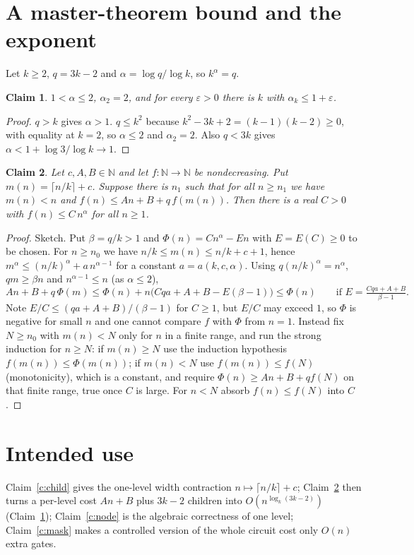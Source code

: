 \documentclass{article}
\newtheorem{claim}{Claim}
\begin{document}
\section{A master-theorem bound and the exponent}
Let $k\ge2$, $q=3k-2$ and $\alpha=\log q/\log k$, so $k^\alpha=q$.

\begin{claim}\label{c:alpha}
$1<\alpha\le2$, $\alpha_2=2$, and for every $\varepsilon>0$ there is $k$ with $\alpha_k\le 1+\varepsilon$.
\end{claim}
\begin{proof} $q>k$ gives $\alpha>1$. $q\le k^2$ because $k^2-3k+2=(k-1)(k-2)\ge0$, with equality at $k=2$, so $\alpha\le2$ and
$\alpha_2=2$. Also $q<3k$ gives $\alpha<1+\log3/\log k\to1$.\end{proof}

\begin{claim}\label{c:master}
Let $c,A,B\in\mathbb N$ and let $f:\mathbb N\to\mathbb N$ be nondecreasing. Put $m(n)=\lceil n/k\rceil+c$. Suppose there is $n_1$ such
that for all $n\ge n_1$ we have $m(n)<n$ and $f(n)\le An+B+q\,f(m(n))$. Then there is a real $C>0$ with
$f(n)\le C\,n^{\alpha}$ for all $n\ge1$.
\end{claim}
\begin{proof} Sketch. Put $\beta=q/k>1$ and $\Phi(n)=Cn^\alpha-En$ with $E=E(C)\ge 0$ to be chosen. For $n\ge n_0$ we have
$n/k\le m(n)\le n/k+c+1$, hence $m^\alpha\le (n/k)^\alpha+a\,n^{\alpha-1}$ for a constant $a=a(k,c,\alpha)$. Using
$q(n/k)^\alpha=n^\alpha$, $qm\ge\beta n$ and $n^{\alpha-1}\le n$ (as $\alpha\le2$),
\[
An+B+q\,\Phi(m)\le \Phi(n)+n\bigl(Cqa+A+B-E(\beta-1)\bigr)\le\Phi(n)\qquad\text{if }E=\tfrac{Cqa+A+B}{\beta-1}.
\]
Note $E/C\le (qa+A+B)/(\beta-1)$ for $C\ge1$, but $E/C$ may exceed $1$, so $\Phi$ is negative for small $n$ and one cannot
compare $f$ with $\Phi$ from $n=1$. Instead fix $N\ge n_0$ with $m(n)<N$ only for $n$ in a finite range, and run the strong induction
for $n\ge N$: if $m(n)\ge N$ use the induction hypothesis $f(m(n))\le\Phi(m(n))$; if $m(n)<N$ use $f(m(n))\le f(N)$ (monotonicity),
which is a constant, and require $\Phi(n)\ge An+B+q f(N)$ on that finite range, true once $C$ is large. For $n<N$ absorb $f(n)\le f(N)$
into $C$.\end{proof}

\section*{Intended use}
Claim~\ref{c:child} gives the one-level width contraction $n\mapsto \lceil n/k\rceil+c$; Claim~\ref{c:master} then turns a
per-level cost $An+B$ plus $3k-2$ children into $O(n^{\log_k(3k-2)})$ (Claim~\ref{c:alpha});
Claim~\ref{c:node} is the algebraic correctness of one level; Claim~\ref{c:mask} makes a controlled version of the whole
circuit cost only $O(n)$ extra gates.
\end{document}

